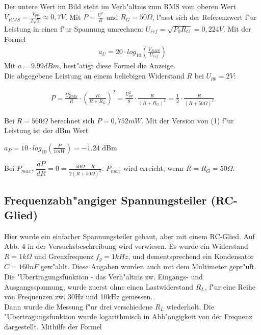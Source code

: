 \documentclass[10pt]{article}
\begin{document}
Der untere Wert im Bild steht im Verh"altnis zum RMS vom oberen Wert $V_{RMS}=\frac{V_{pp}}{2 \sqrt{2}} \approx 0,7V$. Mit $P=\frac{U^2}{R}$ und $R_G=50 \Omega$, l"asst sich der Referenzwert f"ur Leistung in einen f"ur Spannung umrechnen: $U_{ref}=\sqrt{P_0 R_G}=0,224 V$. Mit der Formel
\begin{eqnarray}
 a_U = 20 \cdot log_{10}(\frac{V_{RMS}}{U_{ref}})
\end{eqnarray}
Mit $a=9.99 dBm$, best"atigt diese Formel die Anzeige.\\

Die abgegebene Leistung an einem beliebigen Widerstand $R$ bei $U_{pp}=2V$:

\begin{eqnarray}
 P = \frac{U_{RMS}^2}{R} \cdot (\frac{R}{R+R_G})^2 = \frac{U_{pp}^2}{8} \cdot \frac{R}{(R+R_G)^2} = \frac{1}{2} \cdot \frac{R}{(R+50\Omega)^2}
\end{eqnarray}

Bei $R=560 \Omega$ berechnet sich $P=0,752mW$. Mit der Version von (1) f"ur Leistung ist der dBm Wert 
\begin{center}
$a_P = 10 \cdot log_{10}(\frac{P}{1mW})=-1.24$ dBm
\end{center}

Bei $P_{max}$, $\dfrac{dP}{dR}=0=\frac{50 \Omega - R}{2(R+50 \Omega)^3}$. $P_{max}$ wird erreicht, wenn $R=R_G=50 \Omega$.



\subsection{Frequenzabh"angiger Spannungsteiler (RC-Glied)}

Hier wurde ein einfacher Spannungsteiler gebaut, aber mit einem RC-Glied. Auf Abb. 4 in der Versuchsbeschreibung wird verwiesen. Es wurde ein Widerstand $R=1k\Omega$ und Grenzfrequenz $f_g=1kHz$, und dementsprechend ein Kondensator $C=160nF$ gew"ahlt. Diese Angaben wurden auch mit dem Multimeter gepr"uft. Die "Ubertragungsfunktion - das Verh"altnis zw. Eingangs- und Ausgangsspannung, wurde zuerst ohne einen Lastwiderstand $R_L$, f"ur eine Reihe von Frequenzen zw. 30Hz und 10kHz gemessen.\\

Dann wurde die Messung f"ur drei verschiedene $R_L$ wiederholt. Die "Ubertragungsfunktion wurde logarithmisch in Abh"angigkeit von der Frequenz dargestellt. Mithilfe der Formel
\end{document}
